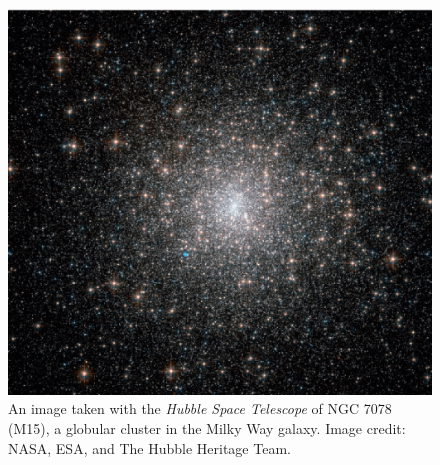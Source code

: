 \begin{figure} [!h]
  \begin{center}
 \includegraphics[scale=0.5]{Chapter-1/m15_hst.ps}
  \caption[An image taken with the \textit{Hubble Space Telescope} of
  the globular cluster NGC 7078]{An image taken with the
    \textit{Hubble Space Telescope} of NGC 7078 (M15), a globular
    cluster in the Milky Way galaxy.  Image credit:  NASA, ESA, and
    The Hubble Heritage Team.
      \label{fig:NGC7078}}
    \end{center}
\end{figure}  

